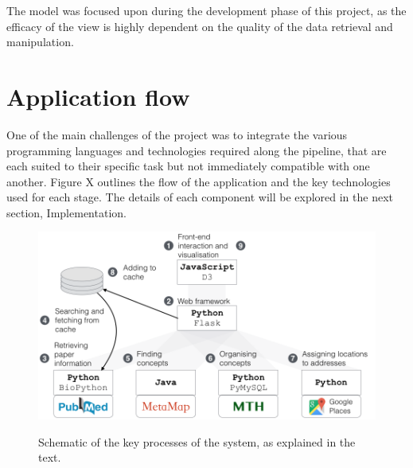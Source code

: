 \documentclass[Report.tex]{subfiles}
\begin{document}
\noindent The model was focused upon during the development phase of this project, as the efficacy of the view is highly dependent on the quality of the data retrieval and manipulation. 

\section{Application flow}
One of the main challenges of the project was to integrate the various programming languages and technologies required along the pipeline, that are each suited to their specific task but not immediately compatible with one another. Figure X outlines the flow of the application and the key technologies used for each stage. The details of each component will be explored in the next section, Implementation.

\begin{figure}[h!]
	\includegraphics[width=\textwidth]{../lib/images/flow.png}
	\label{fig:flow}
	\caption{Schematic of the key processes of the system, as explained in the text.}
\end{figure}
\end{document}
